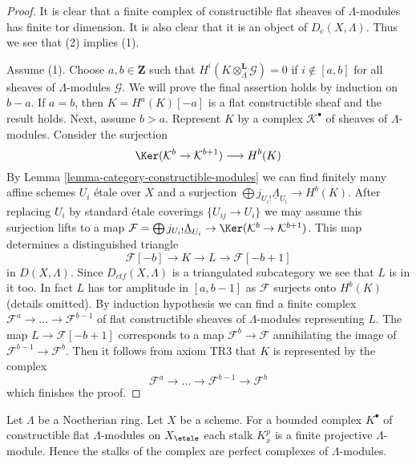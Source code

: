 \begin{proof}
It is clear that a finite complex of constructible
flat sheaves of $\Lambda$-modules has finite tor dimension.
It is also clear that it is an object of $D_c(X, \Lambda)$.
Thus we see that (2) implies (1).

\medskip\noindent
Assume (1). Choose $a, b \in \mathbf{Z}$ such that
$H^i(K \otimes_\Lambda^\mathbf{L} \mathcal{G}) = 0$ if
$i \not \in [a, b]$ for all sheaves of $\Lambda$-modules $\mathcal{G}$.
We will prove the final assertion holds by induction on $b - a$. If
$a = b$, then $K = H^a(K)[-a]$ is a flat constructible sheaf
and the result holds. Next, assume $b > a$. Represent $K$
by a complex $\mathcal{K}^\bullet$ of sheaves of $\Lambda$-modules.
Consider the surjection
$$
\Ker(\mathcal{K}^b \to \mathcal{K}^{b + 1})
\longrightarrow
H^b(K)
$$
By Lemma \ref{lemma-category-constructible-modules}
we can find finitely many affine schemes $U_i$ \'etale over $X$ and a
surjection $\bigoplus j_{U_i!}\underline{\Lambda}_{U_i} \to H^b(K)$.
After replacing $U_i$ by standard \'etale coverings $\{U_{ij} \to U_i\}$
we may assume this surjection lifts to a map
$\mathcal{F} = \bigoplus j_{U_i!}\underline{\Lambda}_{U_i} \to
\Ker(\mathcal{K}^b \to \mathcal{K}^{b + 1})$.
This map determines a distinguished triangle
$$
\mathcal{F}[-b] \to K \to L \to \mathcal{F}[-b + 1]
$$
in $D(X, \Lambda)$. Since $D_{ctf}(X, \Lambda)$ is a triangulated
subcategory we see that $L$ is in it too. In fact $L$ has
tor amplitude in $[a, b - 1]$ as $\mathcal{F}$ surjects onto
$H^b(K)$ (details omitted). By induction hypothesis we can find
a finite complex $\mathcal{F}^a \to \ldots \to \mathcal{F}^{b - 1}$
of flat constructible sheaves of $\Lambda$-modules representing $L$.
The map $L \to \mathcal{F}[-b + 1]$ corresponds to a map
$\mathcal{F}^b \to \mathcal{F}$ annihilating the image
of $\mathcal{F}^{b - 1} \to \mathcal{F}^b$. Then it follows
from axiom TR3 that $K$ is represented by the complex
$$
\mathcal{F}^a \to \ldots \to \mathcal{F}^{b - 1} \to \mathcal{F}^b
$$
which finishes the proof.
\end{proof}

\begin{remark}
\label{remark-projective-each-degree}
Let $\Lambda$ be a Noetherian ring. Let $X$ be a scheme.
For a bounded complex $K^\bullet$ of constructible flat $\Lambda$-modules
on $X_\etale$
each stalk $K^p_{\overline{x}}$ is a finite projective $\Lambda$-module.
Hence the stalks of the complex are perfect complexes of $\Lambda$-modules.
\end{remark}


